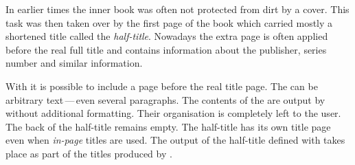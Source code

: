 \begin{Declaration}
\end{Declaration}%
%
\begin{Explain}%
  In earlier times the inner book was often not protected from dirt by a cover.
  This task was then taken over by the first page of the book which
  carried mostly a shortened title called the \emph{half-title}.
  Nowadays the extra page is often applied before the real full title
  and contains information about the publisher, series number and similar
  information.
\end{Explain}
With {\KOMAScript} it is possible to include a page before the real
title page.  The  can be arbitrary text\,---\,even
several paragraphs. The contents of the  are output
by {\KOMAScript} without additional formatting. Their organisation is
completely left to the user. The back of the half-title remains empty.
The half-title has its own title page even when \emph{in-page} titles
are used. The output of the half-title defined with 
takes place as part of the titles produced by .

